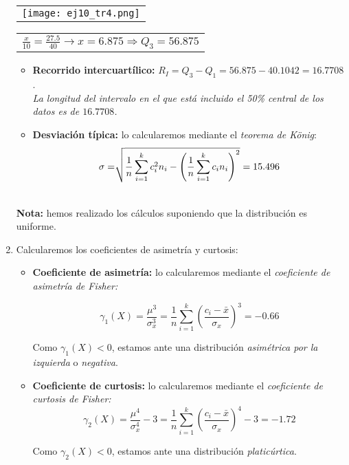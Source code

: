 \documentclass[11pt,a4paper]{article}
\theoremstyle{definition}
\begin{document}
\begin{enumerate}[label=\emph{\alph*})]
\begin{table}[!htbp]
\hspace*{1.1 cm}
\begin{tabular}{c}
\texttt{[image: ej10\_tr4.png]} \\
\end{tabular}
{
\begin{tabular}{l}
$ \frac{x}{10}=\frac{27.5}{40} \rightarrow x = 6.875 \Rightarrow Q_{3}= 56.875 $
\end{tabular}}
\end{table}
\begin{itemize}
		\item \textbf{Recorrido intercuartílico:} $R_I = Q_3 - Q_1 = 56.875-40.1042 = 16.7708$. \\
		\emph{La longitud del intervalo en el que está incluido el 50\% central de los datos es de $16.7708$.}
		\item \textbf{Desviación típica:} lo calcularemos mediante el \emph{teorema de König}: 
		$$ \sigma = \sqrt[\leftroot{-2}\uproot{2}{}]{\frac{1}{n}  \sum_{i=1}^{k}c_i^2n_i - \left( \frac{1}{n}\sum_{i=1}^{k}c_{i}n_{i} \right)^2} = 15.496 $$
		
	\end{itemize}

\hspace{1cm} \\
\small {\textbf {Nota:} hemos realizado los cálculos suponiendo que la distribución es uniforme.} 
\pagebreak
	\item Calcularemos los coeficientes de asimetría y curtosis:
	
	\begin{itemize}
		\item \textbf{Coeficiente de asimetría:} lo calcularemos mediante el \emph{coeficiente de asimetría de Fisher:}
	
		$$ \gamma_1(X) = \frac{\mu^3}{\sigma_x^3} = \frac{1}{n} \sum_{i=1}^{k}{\left(\frac{c_i-\bar{x}}{\sigma_x}\right)^3 = -0.66} $$

Como $\gamma_1(X) < 0$, estamos ante una distribución \emph{asimétrica por la izquierda} o \emph{negativa}. \\

	\item \textbf{Coeficiente de curtosis:} lo calcularemos mediante el \emph{coeficiente de curtosis de Fisher:}
	$$ \gamma_2(X) = \frac{\mu^4}{\sigma_x^4} - 3 = \frac{1}{n} \sum_{i=1}^{k}{\left(\frac{c_i-\bar{x}}{\sigma_x}\right)^4 - 3 = -1.72} $$

Como $\gamma_2(X) < 0$, estamos ante una distribución \emph{platicúrtica}.
	\end{itemize}

	
\end{enumerate}
\end{document}

